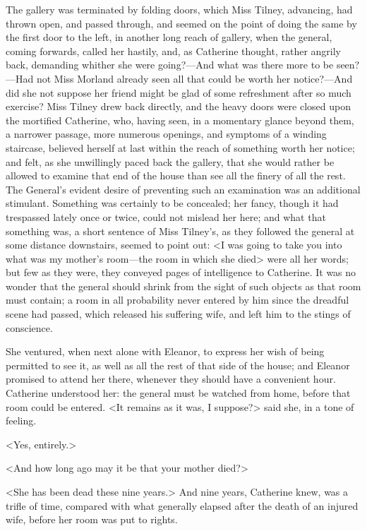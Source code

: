  The gallery was terminated by folding doors, which Miss Tilney, advancing, had thrown open, and passed through, and seemed on the point of doing the same by the first door to the left, in another long reach of gallery, when the general, coming forwards, called her hastily, and, as Catherine thought, rather angrily back, demanding whither she were going?—And what was there more to be seen?—Had not Miss Morland already seen all that could be worth her notice?—And did she not suppose her friend might be glad of some refreshment after so much exercise? Miss Tilney drew back directly, and the heavy doors were closed upon the mortified Catherine, who, having seen, in a momentary glance beyond them, a narrower passage, more numerous openings, and symptoms of a winding staircase, believed herself at last within the reach of something worth her notice; and felt, as she unwillingly paced back the gallery, that she would rather be allowed to examine that end of the house than see all the finery of all the rest. The General's evident desire of preventing such an examination was an additional stimulant. Something was certainly to be concealed; her fancy, though it had trespassed lately once or twice, could not mislead her here; and what that something was, a short sentence of Miss Tilney's, as they followed the general at some distance downstairs, seemed to point out: <I was going to take you into what was my mother's room—the room in which she died\longdash> were all her words; but few as they were, they conveyed pages of intelligence to Catherine. It was no wonder that the general should shrink from the sight of such objects as that room must contain; a room in all probability never entered by him since the dreadful scene had passed, which released his suffering wife, and left him to the stings of conscience. 

 She ventured, when next alone with Eleanor, to express her wish of being permitted to see it, as well as all the rest of that side of the house; and Eleanor promised to attend her there, whenever they should have a convenient hour. Catherine understood her: the general must be watched from home, before that room could be entered. <It remains as it was, I suppose?> said she, in a tone of feeling. 

 <Yes, entirely.> 

 <And how long ago may it be that your mother died?> 

 <She has been dead these nine years.> And nine years, Catherine knew, was a trifle of time, compared with what generally elapsed after the death of an injured wife, before her room was put to rights. 

